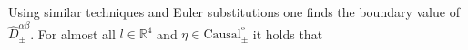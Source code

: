 \documentclass[b5paper,draft,openbib,12pt]{memoir}
\begin{document}




Using similar techniques and Euler substitutions one finds the boundary value of \(\hat{D}^{\alpha \beta}_{\pm}\). For almost all \(l\in\mathbb{R}^4\) and \(\eta \in \text{Causal}^º_{\pm}\) it holds that
\end{document}

